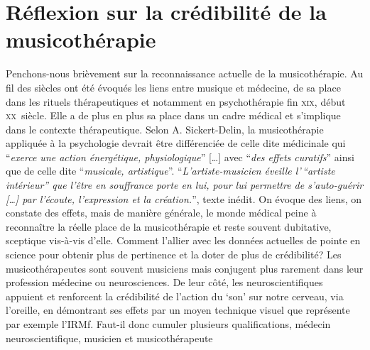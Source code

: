 \section{Réflexion sur la crédibilité de la musicothérapie }

Penchons-nous brièvement sur la reconnaissance actuelle de la musicothérapie.
Au fil des siècles ont été évoqués les liens entre musique et médecine, de sa place dans les
rituels thérapeutiques et notamment en psychothérapie fin \textsc{xix}\ieme,
début \textsc{xx}\ieme\ siècle.
Elle a de plus en plus sa place dans un cadre médical et s'implique dans le contexte thérapeutique.
Selon A. Sickert-Delin, la musicothérapie appliquée à la
psychologie devrait être différenciée de celle dite médicinale qui
\enquote{\emph{exerce une action
énergétique, physiologique}} [\dots] avec \enquote{\emph{des effets curatifs}}
ainsi que de celle dite \enquote{\emph{musicale, artistique}}.
\enquote{\emph{L'artiste-musicien éveille l'\,``artiste intérieur'' que l'être
en souffrance porte en lui, pour lui permettre de s'auto-guérir [\dots] par
l'écoute, l'expression et la création.}}\autocite[14] {viret:b},
texte inédit.
On évoque des liens, on constate des effets, mais de manière générale, le monde médical peine à reconnaître la réelle place de la musicothérapie et reste souvent dubitative, sceptique vis-à-vis d'elle.
 Comment l'allier avec les données actuelles de pointe en
science pour obtenir plus de pertinence
et la doter de plus de crédibilité?
Les musicothérapeutes sont souvent musiciens mais conjugent plus
rarement dans leur profession
médecine ou neurosciences. De leur côté, les neuroscientifiques appuient
et renforcent la crédibilité de l'action du `son' sur notre cerveau, via
l'oreille, en démontrant ses effets par un moyen technique
visuel que représente par exemple l'IRMf. 
Faut-il donc cumuler plusieurs qualifications, médecin neuroscientifique,  musicien et musicothérapeute 

